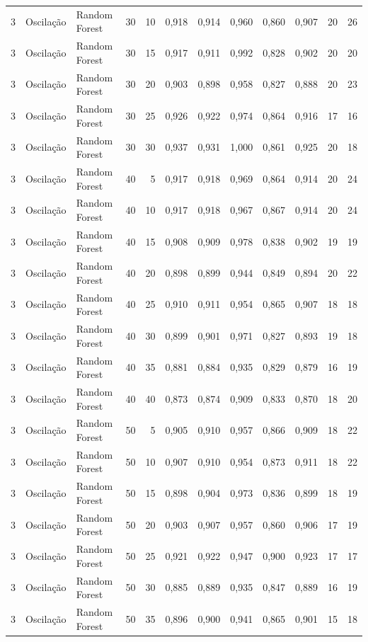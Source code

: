 \begin{longtable}{@{}rllrrrrrrrrr@{}}
3 & Oscilação & Random Forest & 30 & 10 & 0,918 & 0,914 & 0,960 & 0,860 & 0,907 & 20 & 26 \\
3 & Oscilação & Random Forest & 30 & 15 & 0,917 & 0,911 & 0,992 & 0,828 & 0,902 & 20 & 20 \\
3 & Oscilação & Random Forest & 30 & 20 & 0,903 & 0,898 & 0,958 & 0,827 & 0,888 & 20 & 23 \\
3 & Oscilação & Random Forest & 30 & 25 & 0,926 & 0,922 & 0,974 & 0,864 & 0,916 & 17 & 16 \\
3 & Oscilação & Random Forest & 30 & 30 & 0,937 & 0,931 & 1,000 & 0,861 & 0,925 & 20 & 18 \\
3 & Oscilação & Random Forest & 40 & 5 & 0,917 & 0,918 & 0,969 & 0,864 & 0,914 & 20 & 24 \\
3 & Oscilação & Random Forest & 40 & 10 & 0,917 & 0,918 & 0,967 & 0,867 & 0,914 & 20 & 24 \\
3 & Oscilação & Random Forest & 40 & 15 & 0,908 & 0,909 & 0,978 & 0,838 & 0,902 & 19 & 19 \\
3 & Oscilação & Random Forest & 40 & 20 & 0,898 & 0,899 & 0,944 & 0,849 & 0,894 & 20 & 22 \\
3 & Oscilação & Random Forest & 40 & 25 & 0,910 & 0,911 & 0,954 & 0,865 & 0,907 & 18 & 18 \\
3 & Oscilação & Random Forest & 40 & 30 & 0,899 & 0,901 & 0,971 & 0,827 & 0,893 & 19 & 18 \\
3 & Oscilação & Random Forest & 40 & 35 & 0,881 & 0,884 & 0,935 & 0,829 & 0,879 & 16 & 19 \\
3 & Oscilação & Random Forest & 40 & 40 & 0,873 & 0,874 & 0,909 & 0,833 & 0,870 & 18 & 20 \\
3 & Oscilação & Random Forest & 50 & 5 & 0,905 & 0,910 & 0,957 & 0,866 & 0,909 & 18 & 22 \\
3 & Oscilação & Random Forest & 50 & 10 & 0,907 & 0,910 & 0,954 & 0,873 & 0,911 & 18 & 22 \\
3 & Oscilação & Random Forest & 50 & 15 & 0,898 & 0,904 & 0,973 & 0,836 & 0,899 & 18 & 19 \\
3 & Oscilação & Random Forest & 50 & 20 & 0,903 & 0,907 & 0,957 & 0,860 & 0,906 & 17 & 19 \\
3 & Oscilação & Random Forest & 50 & 25 & 0,921 & 0,922 & 0,947 & 0,900 & 0,923 & 17 & 17 \\
3 & Oscilação & Random Forest & 50 & 30 & 0,885 & 0,889 & 0,935 & 0,847 & 0,889 & 16 & 19 \\
3 & Oscilação & Random Forest & 50 & 35 & 0,896 & 0,900 & 0,941 & 0,865 & 0,901 & 15 & 18 \\

\end{longtable}
